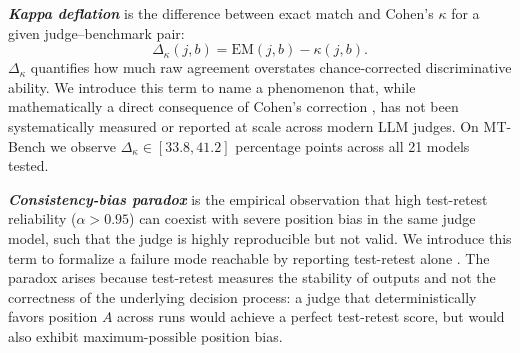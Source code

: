 \documentclass[11pt]{article}
\begin{document}

\textbf{\emph{Kappa deflation}} is the difference between exact match and Cohen's $\kappa$ for a given judge--benchmark pair:
\begin{equation}
\Delta_\kappa(j, b) = \text{EM}(j, b) - \kappa(j, b).
\end{equation}
$\Delta_\kappa$ quantifies how much raw agreement overstates chance-corrected discriminative ability. We introduce this term to name a phenomenon that, while mathematically a direct consequence of Cohen's correction \citep{cohen1960coefficient}, has not been systematically measured or reported at scale across modern LLM judges. On MT-Bench we observe $\Delta_\kappa \in [33.8, 41.2]$ percentage points across all 21 models tested.


\textbf{\emph{Consistency-bias paradox}} is the empirical observation that high test-retest reliability ($\alpha > 0.95$) can coexist with severe position bias in the same judge model, such that the judge is highly reproducible but not valid. We introduce this term to formalize a failure mode reachable by reporting test-retest alone \citep{stureborg2024large, schroeder2024trust,chen-etal-2024-humans}. The paradox arises because test-retest measures the stability of outputs and not the correctness of the underlying decision process: a judge that deterministically favors position $A$ across runs would achieve a perfect test-retest score, but would also exhibit maximum-possible position bias.  %
\end{document}
